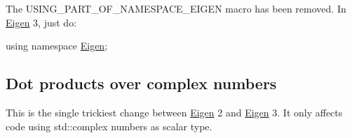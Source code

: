 The U\+S\+I\+N\+G\+\_\+\+P\+A\+R\+T\+\_\+\+O\+F\+\_\+\+N\+A\+M\+E\+S\+P\+A\+C\+E\+\_\+\+E\+I\+G\+EN macro has been removed. In \hyperlink{namespace_eigen}{Eigen} 3, just do\+: 
\begin{DoxyCode}
\textcolor{keyword}{using namespace }\hyperlink{namespace_eigen}{Eigen};
\end{DoxyCode}
\hypertarget{_eigen2_to_eigen3_ComplexDot}{}\subsection{Dot products over complex numbers}\label{_eigen2_to_eigen3_ComplexDot}
This is the single trickiest change between \hyperlink{namespace_eigen}{Eigen} 2 and \hyperlink{namespace_eigen}{Eigen} 3. It only affects code using {\ttfamily std\+::complex} numbers as scalar type.

